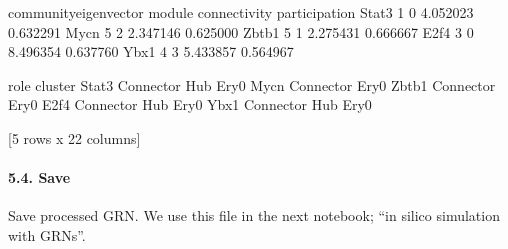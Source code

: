 \documentclass[letterpaper,10pt,english]{sphinxmanual}
\begin{document}
{\begin{sphinxVerbatim}[commandchars=\\\{\}]
       community\PYGZus{}eigenvector  module  connectivity  participation  \PYGZbs{}
Stat3                      1       0      4.052023       0.632291
Mycn                       5       2      2.347146       0.625000
Zbtb1                      5       1      2.275431       0.666667
E2f4                       3       0      8.496354       0.637760
Ybx1                       4       3      5.433857       0.564967

                role  cluster
Stat3  Connector Hub    Ery\PYGZus{}0
Mycn       Connector    Ery\PYGZus{}0
Zbtb1      Connector    Ery\PYGZus{}0
E2f4   Connector Hub    Ery\PYGZus{}0
Ybx1   Connector Hub    Ery\PYGZus{}0

[5 rows x 22 columns]
\end{sphinxVerbatim}
}


\paragraph{5.4. Save}
\label{\detokenize{notebooks/04_Network_analysis/Network_analysis_with_with_Paul_etal_2015_data:5.4.-Save}}
Save processed GRN. We use this file in the next notebook; “in silico simulation with GRNs”.

{
%
\begin{sphinxVerbatim}[commandchars=\\\{\}]
\llap{\color{nbsphinxin}[42]:\,\hspace{\fboxrule}\hspace{\fboxsep}}
\end{sphinxVerbatim}
}

{
%
\begin{sphinxVerbatim}[commandchars=\\\{\}]
\llap{\color{nbsphinxin}[9]:\,\hspace{\fboxrule}\hspace{\fboxsep}}
  

\end{sphinxVerbatim}
}
\end{document}
